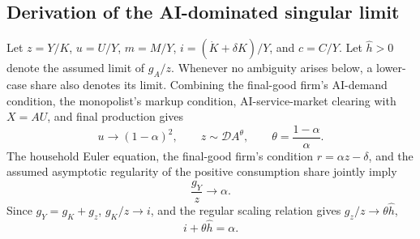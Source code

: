 \subsection{Derivation of the AI-dominated singular limit}

Let \(z=Y/K\), \(u=U/Y\), \(m=M/Y\), \(i=(\dot K+\delta K)/Y\), and
\(c=C/Y\). Let \(\widehat h>0\) denote the assumed limit of \(g_A/z\).
Whenever no ambiguity arises below, a lower-case share also denotes its limit.
Combining the final-good firm's AI-demand condition, the monopolist's markup
condition, AI-service-market clearing with \(X=AU\), and final production gives
\[
 u\to(1-\alpha)^2,\qquad z\sim\mathcal D A^\theta,\qquad
 \theta=\frac{1-\alpha}{\alpha}.
\]
The household Euler equation, the final-good firm's condition
\(r=\alpha z-\delta\), and the assumed asymptotic regularity of the positive
consumption share jointly imply
\[
 \frac{g_Y}{z}\to\alpha.
\]
Since \(g_Y=g_K+g_z\), \(g_K/z\to i\), and the regular scaling relation gives
\(g_z/z\to\theta\widehat h\),
\begin{equation}
 i+\theta\widehat h=\alpha.
 \label{eq:axm-app-resource-growth}
\end{equation}

